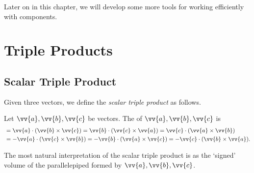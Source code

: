 Later on in this chapter, we will develop some more tools for working efficiently with components.

\section{Triple Products}

\subsection{Scalar Triple Product}

Given three vectors, we define the \emph{scalar triple product} as follows.

\begin{definition}
    Let $\vv{a}, \vv{b}, \vv{c}$ be vectors. The  of $\vv{a}, \vv{b}, \vv{c}$ is
    \begin{align*}
        [\vv{a}, \vv{b}, \vv{c}] &= \vv{a} \cdot ( \vv{b} \times \vv{c}) =  \vv{b} \cdot ( \vv{c} \times \vv{a}) =  \vv{c} \cdot ( \vv{a} \times \vv{b}) \\
    &= - \vv{a} \cdot ( \vv{c} \times \vv{b}) =  -\vv{b} \cdot ( \vv{a} \times \vv{c}) =  -\vv{c} \cdot ( \vv{b} \times \vv{a}).
    \end{align*}
\end{definition}

The most natural interpretation of the scalar triple product is as the `signed' volume of the parallelepiped formed by $\vv{a}, \vv{b}, \vv{c}$.

